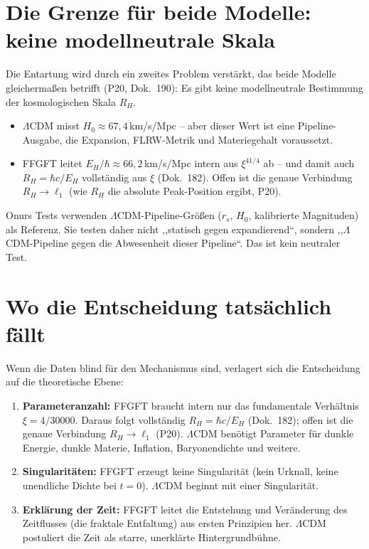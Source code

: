 \section{Die Grenze für beide Modelle: keine modellneutrale Skala}

Die Entartung wird durch ein zweites Problem verstärkt, das beide Modelle
gleichermaßen betrifft (P20, Dok.~190): Es gibt keine modellneutrale
Bestimmung der kosmologischen Skala $R_H$.

\begin{itemize}
  \item $\Lambda$CDM misst $H_0 \approx 67{,}4$\,km/s/Mpc -- aber dieser
        Wert ist eine Pipeline-Ausgabe, die Expansion, FLRW-Metrik und
        Materiegehalt voraussetzt.
  \item FFGFT leitet $E_H/\hbar \approx 66{,}2$\,km/s/Mpc intern aus
        $\xi^{41/4}$ ab -- und damit auch $R_H = \hbar c/E_H$ vollständig
        aus $\xi$ (Dok.~182). Offen ist die genaue Verbindung $R_H \to \ell_1$
        (wie $R_H$ die absolute Peak-Position ergibt, P20).
\end{itemize}

Onurs Tests verwenden $\Lambda$CDM-Pipeline-Größen ($r_s$, $H_0$,
kalibrierte Magnituden) als Referenz. Sie testen daher nicht ,,statisch
gegen expandierend``, sondern ,,$\Lambda$CDM-Pipeline gegen die Abwesenheit
dieser Pipeline``. Das ist kein neutraler Test.

\section{Wo die Entscheidung tatsächlich fällt}

Wenn die Daten blind für den Mechanismus sind, verlagert sich die
Entscheidung auf die theoretische Ebene:

\begin{enumerate}
  \item \textbf{Parameteranzahl:} FFGFT braucht intern nur das fundamentale
        Verhältnis $\xi = 4/30000$. Daraus folgt vollständig $R_H = \hbar c/E_H$
        (Dok.~182); offen ist die genaue Verbindung $R_H \to \ell_1$ (P20).
        $\Lambda$CDM benötigt Parameter für dunkle Energie,
        dunkle Materie, Inflation, Baryonendichte und weitere.
  \item \textbf{Singularitäten:} FFGFT erzeugt keine Singularität (kein
        Urknall, keine unendliche Dichte bei $t=0$). $\Lambda$CDM beginnt
        mit einer Singularität.
  \item \textbf{Erklärung der Zeit:} FFGFT leitet die Entstehung und
        Veränderung des Zeitflusses (die fraktale Entfaltung) aus ersten
        Prinzipien her. $\Lambda$CDM postuliert die Zeit als starre,
        unerklärte Hintergrundbühne.
\end{enumerate}

